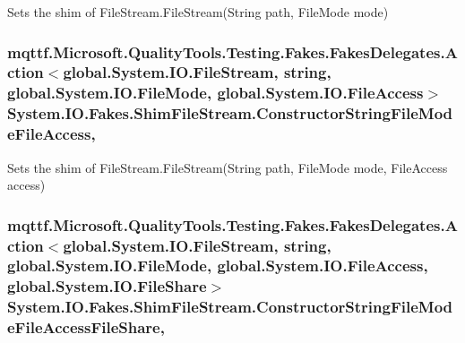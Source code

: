 Sets the shim of File\-Stream.\-File\-Stream(\-String path, File\-Mode mode)

\hypertarget{class_system_1_1_i_o_1_1_fakes_1_1_shim_file_stream_a887ebdd11f80824bc9edd71fa6af7ea5}{
\subsubsection[{Constructor\-String\-File\-Mode\-File\-Access}]{\setlength{\rightskip}{0pt plus 5cm}mqttf.\-Microsoft.\-Quality\-Tools.\-Testing.\-Fakes.\-Fakes\-Delegates.\-Action$<$global.\-System.\-I\-O.\-File\-Stream, string, global.\-System.\-I\-O.\-File\-Mode, global.\-System.\-I\-O.\-File\-Access$>$ System.\-I\-O.\-Fakes.\-Shim\-File\-Stream.\-Constructor\-String\-File\-Mode\-File\-Access\hspace{0.3cm}{\ttfamily [static]}, {\ttfamily [set]}}}\label{class_system_1_1_i_o_1_1_fakes_1_1_shim_file_stream_a887ebdd11f80824bc9edd71fa6af7ea5}


Sets the shim of File\-Stream.\-File\-Stream(\-String path, File\-Mode mode, File\-Access access)

\hypertarget{class_system_1_1_i_o_1_1_fakes_1_1_shim_file_stream_a7ddf87d61ad9926d3bb3f43d155b4c17}{
\subsubsection[{Constructor\-String\-File\-Mode\-File\-Access\-File\-Share}]{\setlength{\rightskip}{0pt plus 5cm}mqttf.\-Microsoft.\-Quality\-Tools.\-Testing.\-Fakes.\-Fakes\-Delegates.\-Action$<$global.\-System.\-I\-O.\-File\-Stream, string, global.\-System.\-I\-O.\-File\-Mode, global.\-System.\-I\-O.\-File\-Access, global.\-System.\-I\-O.\-File\-Share$>$ System.\-I\-O.\-Fakes.\-Shim\-File\-Stream.\-Constructor\-String\-File\-Mode\-File\-Access\-File\-Share\hspace{0.3cm}{\ttfamily [static]}, {\ttfamily [set]}}}\label{class_system_1_1_i_o_1_1_fakes_1_1_shim_file_stream_a7ddf87d61ad9926d3bb3f43d155b4c17}


